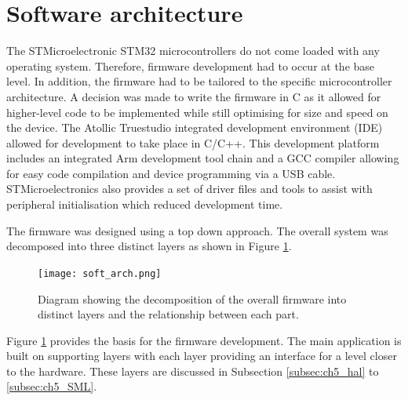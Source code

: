 \section{Software architecture}

The STMicroelectronic STM32 microcontrollers do not come loaded with any operating system. Therefore, firmware development had to occur at the base level. In addition, the firmware had to be tailored to the specific microcontroller architecture. A decision was made to write the firmware in C as it allowed for higher-level code to be implemented while still optimising for size and speed on the device. The Atollic Truestudio integrated development environment (IDE) allowed for development to take place in C/C++. This development platform includes an integrated Arm development tool chain and a GCC compiler allowing for easy code compilation and device programming via a USB cable. STMicroelectronics also provides a set of driver files and tools to assist with peripheral initialisation which reduced development time. \par 

The firmware was designed using a top down approach. The overall system was decomposed into three distinct layers as shown in Figure \ref{fig:soft_arch}.

\begin{figure}[H]
	\centering
	\texttt{[image: soft\_arch.png]}
	\caption{Diagram showing the decomposition of the overall firmware into distinct layers and the relationship between each part.}
	\label{fig:soft_arch}
\end{figure}

Figure \ref{fig:soft_arch} provides the basis for the firmware development. The main application is built on supporting layers with each layer providing an interface for a level closer to the hardware. These layers are discussed in Subsection \ref{subsec:ch5_hal} to \ref{subsec:ch5_SML}. 

